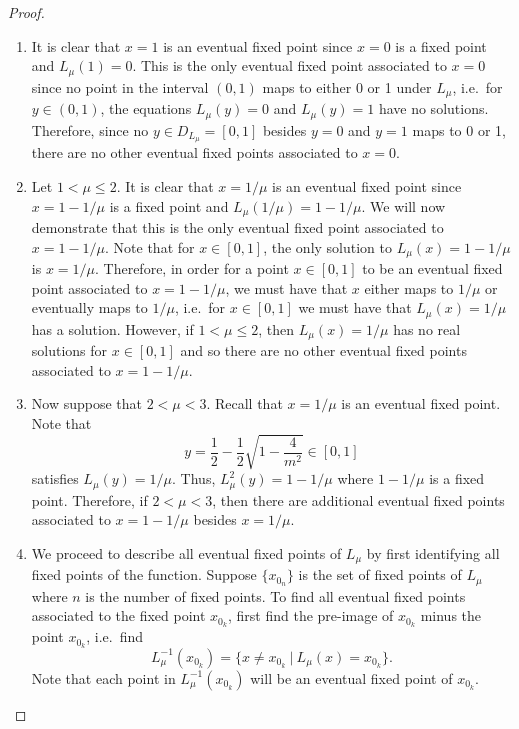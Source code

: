 \begin{proof}
  \begin{enumerate}
    \item It is clear that $x=1$ is an eventual fixed
      point since $x=0$ is a fixed point and $L_\mu(1) = 0$.
      This is the only eventual fixed point associated to $x=0$ since no point
      in the interval $(0, 1)$ maps to either 0 or 1 under $L_\mu$, i.e.\
      for $y\in(0,1)$, the equations $L_\mu(y) = 0$ and $L_\mu(y) = 1$
      have no solutions. Therefore, since no $y \in D_{L_\mu} = [0, 1]$ besides
      $y=0$ and $y=1$ maps to 0 or 1, there are no other eventual fixed points
      associated to $x=0$.
    \item Let $1 < \mu \leq 2$. It is clear that $x = 1/\mu$ is an eventual
      fixed point since $x = 1 - 1/\mu$ is a fixed point and
      $L_\mu(1/\mu) = 1 - 1/\mu$.
      We will now demonstrate that this is the only eventual fixed point
      associated to $x = 1 - 1/\mu$. Note that
      for $x \in [0, 1]$, the only solution to $L_\mu(x) = 1 - 1/\mu$ is $x = 1/\mu$.
      Therefore, in order for a point $x \in [0, 1]$ to be an eventual fixed point
      associated to $x = 1 - 1/\mu$, we must have that $x$ either maps to $1/\mu$
      or eventually maps to $1/\mu$, i.e.\ for $x \in [0, 1]$ we must have that
      $L_\mu(x) = 1/\mu$ has a solution. However, if $1 < \mu \leq 2$,
      then $L_\mu(x) = 1/\mu$ has no real solutions for $x \in [0, 1]$ and  so
      there are no other eventual fixed points associated to $x = 1 - 1/\mu$.
    \item Now suppose that $2 < \mu < 3$. Recall that $x = 1/\mu$ is an eventual fixed point.
      Note that
      $$y = \frac{1}{2} - \frac{1}{2}\sqrt{1 - \frac{4}{m^2}} \in [0, 1]$$
      satisfies $L_\mu(y) = 1/\mu$. Thus, $L_\mu^2(y) = 1 - 1/\mu$ where $1 - 1/\mu$ is a fixed point.
      Therefore, if $2 < \mu < 3$, then there are additional eventual fixed points associated
      to $x = 1 - 1/\mu$ besides $x = 1/\mu$.
    \item We proceed to describe all eventual
      fixed points of $L_\mu$ by first identifying all fixed points of the function.
      Suppose $\{x_{0_n}\}$ is the set of fixed points of $L_\mu$ where $n$ is the number
      of fixed points. To find all eventual fixed
      points associated to the fixed point $x_{0_k}$,
      first find the pre-image of $x_{0_k}$ minus the point $x_{0_k}$, i.e.\ find
      $$L_\mu^{-1}\left(x_{0_k}\right) = \{x \neq x_{0_k}\ |\ L_\mu(x) = x_{0_k} \}.$$
      Note that each point in $L_\mu^{-1}(x_{0_k})$ will be an eventual fixed point of $x_{0_k}$.

\end{enumerate}
\end{proof}
